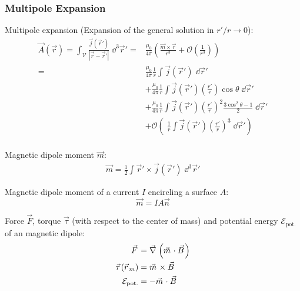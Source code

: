 		\subsubsection{Multipole Expansion}
			\noindent
			Multipole expansion (Expansion of the general solution in $r'/r \to 0$):
			\begin{equation}
				\begin{aligned}
					\vec{A}(\vec{r}) = \int_{\mathcal{V}} \frac{\vec{j}(\vec{r}')}{\left|\vec{r}-\vec{r}'\right|} \;\dd^3\vec{r}'
					=& \frac{\mu_0}{4\pi} \left(\frac{\vec{m}\times\vec{r}}{r^3} + \mathcal{O}\left(\frac{1}{r^3}\right)\right) \\
					=& \frac{\mu_0}{4\pi}\frac{1}{r}\int\vec{j}(\vec{r}')\;\dd \vec{r}' \\
					&+ \frac{\mu_0}{4\pi}\frac{1}{r}\int\vec{j}(\vec{r}')\left(\frac{r'}{r}\right)\cos\theta\;\dd \vec{r}' \\
					&+ \frac{\mu_0}{4\pi}\frac{1}{r}\int\vec{j}(\vec{r}')\left(\frac{r'}{r}\right)^2\frac{3\cos^2\theta-1}{2}\;\dd \vec{r}' \\
					&+ \mathcal{O}\left(\;\frac{1}{r}\int\vec{j}(\vec{r}')\left(\frac{r'}{r}\right)^3 \;\dd \vec{r}'\right) \\
				\end{aligned}
			\end{equation}

			\noindent
			Magnetic dipole moment $\vec{m}$:
			\begin{equation}
				\begin{aligned}
					\vec{m} = \frac{1}{2}\int \vec{r}'\times\vec{j}(\vec{r}')\;\dd^3\vec{r}'
				\end{aligned}
			\end{equation}

			\noindent
			Magnetic dipole moment of a current $I$ encircling a surface $A$:
			\begin{equation}
				\vec{m} = IA\vec{n}
			\end{equation}


			\noindent
			Force $\vec{F}$, torque $\vec{\tau}$ (with respect to the center of mass) and potential energy $\mathcal{E}_\text{pot.}$ of an magnetic dipole:
			\begin{equation}
				\begin{aligned}
					\vec{F} &= \Nabla\left(\vec{m}\cdot\vec{B}\right) \\
					\vec{\tau}(\vec{r}_m) &= \vec{m}\times\vec{B} \\
					\mathcal{E}_\text{pot.} &= -\vec{m}\cdot\vec{B} \\
				\end{aligned}
				\label{Eq:MagneticDipoleInteraction}
			\end{equation}

